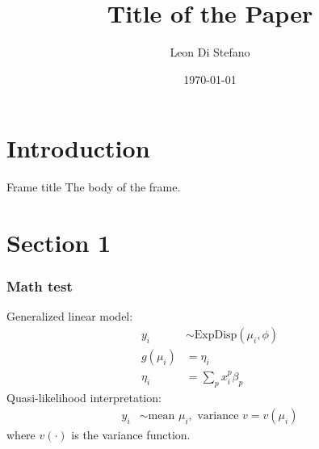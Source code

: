 \documentclass[11pt]{beamer}
\title{Title of the Paper}
\author{Leon Di Stefano}
\date{\today}
\begin{document}
\begin{frame}
    \titlepage
\end{frame}

\begin{frame}
    \tableofcontents
\end{frame}

\section{Introduction}
\begin{frame}{Frame title}
    The body of the frame.
\end{frame}

\section{Section 1}

\begin{frame}
    \frametitle{Math test}
    Generalized linear model:
    \begin{align*}
        y_i &\sim \text{ExpDisp}(\mu_i, \phi) \\
        g(\mu_i) &= \eta_i \\
        \eta_i &= \sum_p x_i^p \beta_p
    \end{align*}
    Quasi-likelihood interpretation:
    \begin{align*}
        y_i &\sim \text{mean } \mu_i, \text{ variance } v = v(\mu_i)
    \end{align*}
    where $v(\cdot)$ is the variance function.
\end{frame}
\end{document}
